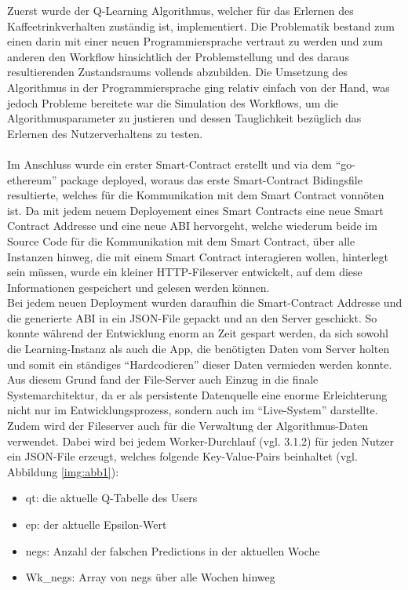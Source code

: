 Zuerst wurde der Q-Learning Algorithmus, welcher für das Erlernen des Kaffeetrinkverhalten zuständig ist, implementiert. Die Problematik bestand zum einen darin mit einer neuen Programmiersprache vertraut zu werden und zum anderen den Workflow hinsichtlich der Problemstellung und des daraus resultierenden Zustandsraums vollends abzubilden. Die Umsetzung des Algorithmus in der Programmiersprache ging relativ einfach von der Hand, was jedoch Probleme bereitete war die Simulation des Workflows, um die Algorithmusparameter zu justieren und dessen Tauglichkeit bezüglich das Erlernen des Nutzerverhaltens zu testen.\\\\
Im Anschluss wurde ein erster Smart-Contract erstellt und via dem “go-ethereum” package deployed, woraus das erste Smart-Contract Bidingsfile resultierte, welches für die Kommunikation mit dem Smart Contract vonnöten ist. Da mit jedem neuem Deployement eines Smart Contracts eine neue Smart Contract Addresse und eine neue ABI hervorgeht, welche wiederum beide im Source Code für die Kommunikation mit dem Smart Contract, über alle Instanzen hinweg, die mit einem Smart Contract interagieren wollen, hinterlegt sein müssen, wurde ein kleiner HTTP-Fileserver entwickelt, auf dem diese Informationen gespeichert und gelesen werden können. \\
Bei jedem neuen Deployment wurden daraufhin die Smart-Contract Addresse und die generierte ABI in ein JSON-File gepackt und an den Server geschickt. So konnte während der Entwicklung enorm an Zeit gespart werden, da sich sowohl die Learning-Instanz als auch die App, die benötigten Daten vom Server holten und somit ein ständiges “Hardcodieren” dieser Daten vermieden werden konnte. \\
Aus diesem Grund fand der File-Server auch Einzug in die finale Systemarchitektur, da er als persistente Datenquelle eine enorme Erleichterung nicht nur im Entwicklungsprozess, sondern auch im “Live-System” darstellte. \\
Zudem wird der Fileserver auch für die Verwaltung der Algorithmus-Daten verwendet. Dabei wird bei jedem Worker-Durchlauf (vgl. 3.1.2) für jeden Nutzer ein JSON-File erzeugt, welches folgende Key-Value-Pairs beinhaltet (vgl. Abbildung \ref{img:abb1}): 
\begin{itemize}
	\item qt: die aktuelle Q-Tabelle des Users
	\item ep: der aktuelle Epsilon-Wert
	\item negs: Anzahl der falschen Predictions in der aktuellen Woche
	\item Wk\_negs: Array von negs über alle Wochen hinweg
\end{itemize}


